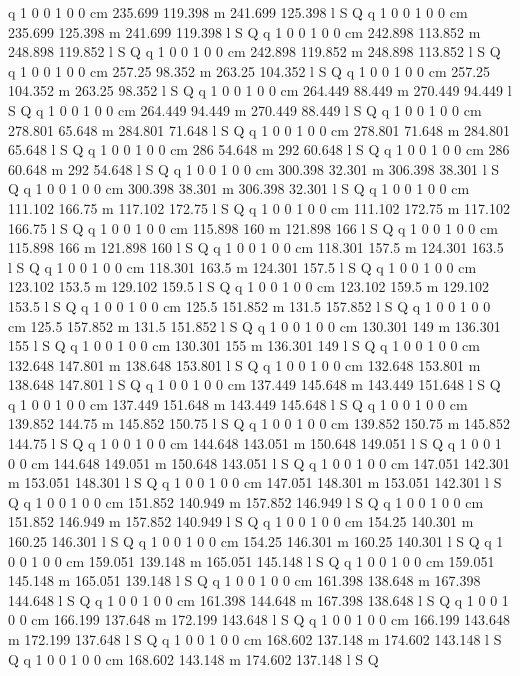 q 1 0 0 1 0 0 cm
235.699 119.398 m 241.699 125.398 l S Q
q 1 0 0 1 0 0 cm
235.699 125.398 m 241.699 119.398 l S Q
q 1 0 0 1 0 0 cm
242.898 113.852 m 248.898 119.852 l S Q
q 1 0 0 1 0 0 cm
242.898 119.852 m 248.898 113.852 l S Q
q 1 0 0 1 0 0 cm
257.25 98.352 m 263.25 104.352 l S Q
q 1 0 0 1 0 0 cm
257.25 104.352 m 263.25 98.352 l S Q
q 1 0 0 1 0 0 cm
264.449 88.449 m 270.449 94.449 l S Q
q 1 0 0 1 0 0 cm
264.449 94.449 m 270.449 88.449 l S Q
q 1 0 0 1 0 0 cm
278.801 65.648 m 284.801 71.648 l S Q
q 1 0 0 1 0 0 cm
278.801 71.648 m 284.801 65.648 l S Q
q 1 0 0 1 0 0 cm
286 54.648 m 292 60.648 l S Q
q 1 0 0 1 0 0 cm
286 60.648 m 292 54.648 l S Q
q 1 0 0 1 0 0 cm
300.398 32.301 m 306.398 38.301 l S Q
q 1 0 0 1 0 0 cm
300.398 38.301 m 306.398 32.301 l S Q
q 1 0 0 1 0 0 cm
111.102 166.75 m 117.102 172.75 l S Q
q 1 0 0 1 0 0 cm
111.102 172.75 m 117.102 166.75 l S Q
q 1 0 0 1 0 0 cm
115.898 160 m 121.898 166 l S Q
q 1 0 0 1 0 0 cm
115.898 166 m 121.898 160 l S Q
q 1 0 0 1 0 0 cm
118.301 157.5 m 124.301 163.5 l S Q
q 1 0 0 1 0 0 cm
118.301 163.5 m 124.301 157.5 l S Q
q 1 0 0 1 0 0 cm
123.102 153.5 m 129.102 159.5 l S Q
q 1 0 0 1 0 0 cm
123.102 159.5 m 129.102 153.5 l S Q
q 1 0 0 1 0 0 cm
125.5 151.852 m 131.5 157.852 l S Q
q 1 0 0 1 0 0 cm
125.5 157.852 m 131.5 151.852 l S Q
q 1 0 0 1 0 0 cm
130.301 149 m 136.301 155 l S Q
q 1 0 0 1 0 0 cm
130.301 155 m 136.301 149 l S Q
q 1 0 0 1 0 0 cm
132.648 147.801 m 138.648 153.801 l S Q
q 1 0 0 1 0 0 cm
132.648 153.801 m 138.648 147.801 l S Q
q 1 0 0 1 0 0 cm
137.449 145.648 m 143.449 151.648 l S Q
q 1 0 0 1 0 0 cm
137.449 151.648 m 143.449 145.648 l S Q
q 1 0 0 1 0 0 cm
139.852 144.75 m 145.852 150.75 l S Q
q 1 0 0 1 0 0 cm
139.852 150.75 m 145.852 144.75 l S Q
q 1 0 0 1 0 0 cm
144.648 143.051 m 150.648 149.051 l S Q
q 1 0 0 1 0 0 cm
144.648 149.051 m 150.648 143.051 l S Q
q 1 0 0 1 0 0 cm
147.051 142.301 m 153.051 148.301 l S Q
q 1 0 0 1 0 0 cm
147.051 148.301 m 153.051 142.301 l S Q
q 1 0 0 1 0 0 cm
151.852 140.949 m 157.852 146.949 l S Q
q 1 0 0 1 0 0 cm
151.852 146.949 m 157.852 140.949 l S Q
q 1 0 0 1 0 0 cm
154.25 140.301 m 160.25 146.301 l S Q
q 1 0 0 1 0 0 cm
154.25 146.301 m 160.25 140.301 l S Q
q 1 0 0 1 0 0 cm
159.051 139.148 m 165.051 145.148 l S Q
q 1 0 0 1 0 0 cm
159.051 145.148 m 165.051 139.148 l S Q
q 1 0 0 1 0 0 cm
161.398 138.648 m 167.398 144.648 l S Q
q 1 0 0 1 0 0 cm
161.398 144.648 m 167.398 138.648 l S Q
q 1 0 0 1 0 0 cm
166.199 137.648 m 172.199 143.648 l S Q
q 1 0 0 1 0 0 cm
166.199 143.648 m 172.199 137.648 l S Q
q 1 0 0 1 0 0 cm
168.602 137.148 m 174.602 143.148 l S Q
q 1 0 0 1 0 0 cm
168.602 143.148 m 174.602 137.148 l S Q
